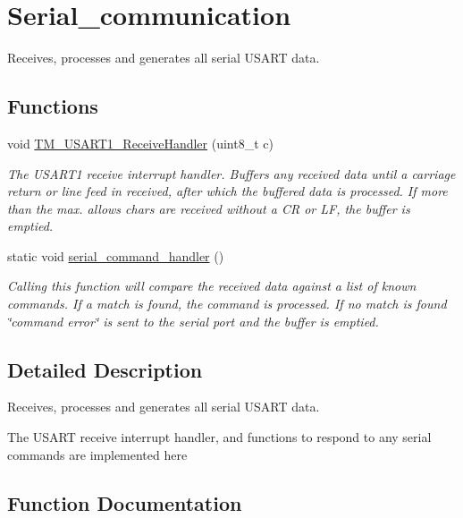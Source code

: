 \hypertarget{group__serial__communication}{}\section{Serial\+\_\+communication}
\label{group__serial__communication}


Receives, processes and generates all serial U\+S\+A\+R\+T data.  


\subsection*{Functions}
\begin{DoxyCompactItemize}
\item 
void \hyperlink{group__serial__communication_ga7105ae13077efe98fe046a85c40814d5}{T\+M\+\_\+\+U\+S\+A\+R\+T1\+\_\+\+Receive\+Handler} (uint8\+\_\+t c)
\begin{DoxyCompactList}\small\item\em The U\+S\+A\+R\+T1 receive interrupt handler. Buffers any received data until a carriage return or line feed in received, after which the buffered data is processed. If more than the max. allows chars are received without a C\+R or L\+F, the buffer is emptied. \end{DoxyCompactList}\item 
static void \hyperlink{group__serial__communication_ga0623c99dae0c534b9d2a008be41572e8}{serial\+\_\+command\+\_\+handler} ()
\begin{DoxyCompactList}\small\item\em Calling this function will compare the received data against a list of known commands. If a match is found, the command is processed. If no match is found \char`\"{}command error\char`\"{} is sent to the serial port and the buffer is emptied. \end{DoxyCompactList}\end{DoxyCompactItemize}


\subsection{Detailed Description}
Receives, processes and generates all serial U\+S\+A\+R\+T data. 

The U\+S\+A\+R\+T receive interrupt handler, and functions to respond to any serial commands are implemented here 

\subsection{Function Documentation}
\hypertarget{group__serial__communication_ga0623c99dae0c534b9d2a008be41572e8}{}
